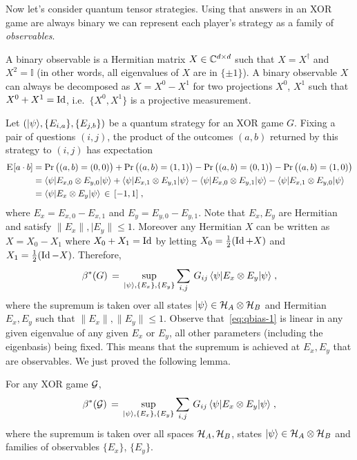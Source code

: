 Now let's consider quantum tensor strategies. Using that answers in an XOR game are always binary we can represent each player's strategy as a family of \emph{observables}.

\begin{definition}
A binary observable is a Hermitian matrix $X\in \mathbb{C}^{d\times d}$ such that $X=X^\dagger$ and $X^2=\mathbb{I}$ (in other words, all eigenvalues of $X$ are in $\{\pm 1\}$). A binary observable $X$ can always be decomposed as $X = X^0 - X^1$ for two projections $X^0$, $X^1$ such that $X^0+X^1 = \mathop{\rm Id}\nolimits$, i.e.\ $\{X^0,X^1\}$ is a projective measurement. 
\end{definition}

Let $(|\psi\rangle,\{E_{i,a}\},\{E_{j,b}\})$ be a quantum strategy for an XOR game $G$. Fixing a pair of questions $(i,j)$, the product of the outcomes $(a,b)$ returned by this strategy to $(i,j)$ has expectation
\begin{align*}
\textsc{E}_{}[a\cdot b] &= \Pr\big( (a,b)=(0,0) \big) + \Pr\big( (a,b)=(1,1) \big) - \Pr\big( (a,b)=(0,1) \big)  - \Pr\big( (a,b)=(1,0) \big) \\
&=  \langle\psi| E_{x,0} \otimes E_{y,0} |\psi\rangle + \langle\psi| E_{x,1} \otimes E_{y,1} |\psi\rangle - \langle\psi| E_{x,0} \otimes E_{y,1} |\psi\rangle - \langle\psi| E_{x,1} \otimes E_{y,0}|\psi\rangle\\
&=  \langle\psi|E_x \otimes E_y |\psi\rangle \,\in\,[-1,1]\;,
\end{align*}
where $E_x = E_{x,0}-E_{x,1}$ and $E_y=E_{y,0}-E_{y,1}$. Note that $E_x,E_y$ are Hermitian and satisfy $\|E_x\|,|E_y\|\leq 1$. Moreover any Hermitian $X$ can be written as $X=X_0-X_1$ where $X_0+X_1=\mathop{\rm Id}\nolimits$ by letting $X_0 = \frac{1}{2}(\mathop{\rm Id}\nolimits+X)$ and $X_1=\frac{1}{2}(\mathop{\rm Id}\nolimits-X)$. Therefore, 
\begin{equation}\label{eq:qbias-1}
\beta^*(G) \,=\, \sup_{|\psi\rangle,\{E_x\},\{E_y\}} \sum_{i,j} \,G_{ij}\, \langle\psi| E_x \otimes E_y |\psi\rangle\;,
\end{equation}
where the supremum is taken over all states $|\psi\rangle\in \mathcal{H}_A\otimes \mathcal{H}_B$ and Hermitian $E_x,E_y$ such that $\|E_x\|,\|E_y\|\leq 1$. Observe that~\eqref{eq:qbias-1} is linear in any given eigenvalue of any given $E_x$ or $E_y$, all other parameters (including the eigenbasis) being fixed. This means that the supremum is achieved at $E_x,E_y$ that are observables. We just proved the following lemma.

\begin{lemma}
For any XOR game $\mathcal{G}$, 
 \begin{equation}\label{eq:bias-quant}
 \beta^*(\mathcal{G}) \,=\, \sup_{|\psi\rangle,\{E_x\},\{E_y\}} \sum_{i,j}\, G_{ij}\, \langle\psi| E_x \otimes E_y |\psi\rangle\;,
 \end{equation}
where the supremum is taken over all spaces $\mathcal{H}_A,\mathcal{H}_B$, states $|\psi\rangle\in \mathcal{H}_A\otimes \mathcal{H}_B$ and families of observables $\{E_x\}$, $\{E_y\}$.
\end{lemma}

